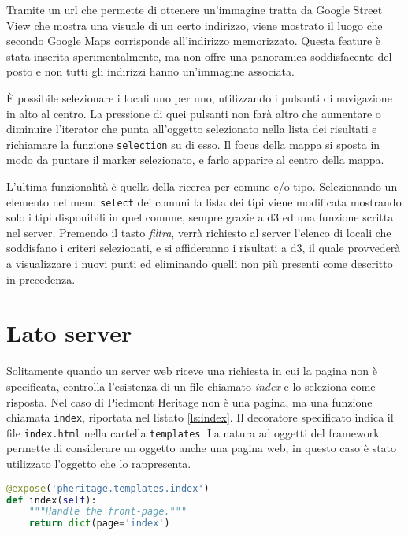 Tramite un url che permette di ottenere un'immagine tratta da Google Street View che mostra una visuale di un certo indirizzo, viene mostrato il luogo che secondo Google Maps corrisponde all'indirizzo memorizzato. Questa feature è stata inserita sperimentalmente, ma non offre una panoramica soddisfacente del posto e non tutti gli indirizzi hanno un'immagine associata.

\`E possibile selezionare i locali uno per uno, utilizzando i pulsanti di navigazione in alto al centro. La pressione di quei pulsanti non farà altro che aumentare o diminuire l'iterator che punta all'oggetto selezionato nella lista dei risultati e richiamare la funzione \texttt{selection} su di esso. \label{sec:riposizionamento}Il focus della mappa si sposta in modo da puntare il marker selezionato, e farlo apparire al centro della mappa.

L'ultima funzionalità è quella della ricerca per comune e/o tipo. Selezionando un elemento nel menu \texttt{select} dei comuni la lista dei tipi viene modificata mostrando solo i tipi disponibili in quel comune, sempre grazie a d3 ed una funzione scritta nel server. Premendo il tasto \emph{filtra}, verrà richiesto al server l'elenco di locali che soddisfano i criteri selezionati, e si affideranno i risultati a d3, il quale provvederà a visualizzare i nuovi punti ed eliminando quelli non più presenti come descritto in precedenza.

\section{Lato server}
Solitamente quando un server web riceve una richiesta in cui la pagina non è specificata, controlla l'esistenza di un file chiamato \emph{index} e lo seleziona come risposta. Nel caso di Piedmont Heritage non è una pagina, ma una funzione chiamata \texttt{index}, riportata nel listato \ref{ls:index}. Il decoratore specificato indica il file \texttt{index.html} nella cartella \texttt{templates}. La natura ad oggetti del framework permette di considerare un oggetto anche una pagina web, in questo caso è stato utilizzato l'oggetto che lo rappresenta.
\begin{lstlisting}[label=ls:index,caption={root controller, funzione index, richiamata alla richiesta della pagina web da parte del client.},language=Python]
@expose('pheritage.templates.index')
def index(self):
    """Handle the front-page."""
    return dict(page='index')
\end{lstlisting}

